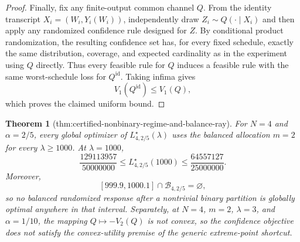 \documentclass{article}
\newtheorem{theorem}{Theorem}
\begin{document}
\begin{proof}
Finally, fix any finite-output common channel \(Q\). From the identity transcript \(X_i=(W_i,Y_i(W_i))\), independently draw \(Z_i\sim Q(\cdot\mid X_i)\) and then apply any randomized confidence rule designed for \(Z\). By conditional product randomization, the resulting confidence set has, for every fixed schedule, exactly the same distribution, coverage, and expected cardinality as in the experiment using \(Q\) directly. Thus every feasible rule for \(Q\) induces a feasible rule with the same worst-schedule loss for \(Q^{\mathrm{id}}\). Taking infima gives
\[
 V_1(Q^{\mathrm{id}})\le V_1(Q),
\]
which proves the claimed uniform bound.
\end{proof}

\begin{theorem}[thm:certified-nonbinary-regime-and-balance-ray]\label{thm:certified-nonbinary-regime-and-balance-ray}
For \(N=4\) and \(\alpha=2/5\), every global optimizer of \(L^\star_{4,2/5}(\lambda)\) uses the balanced allocation \(m=2\) for every \(\lambda\ge1000\). At \(\lambda=1000\),
\[
 \frac{129113957}{50000000}
 \le L^\star_{4,2/5}(1000)
 \le \frac{64557127}{25000000}.
\]
Moreover,
\[
 [999.9,1000.1]\cap\mathcal B_{4,2/5}=\varnothing,
\]
so no balanced randomized response after a nontrivial binary partition is globally optimal anywhere in that interval. Separately, at \(N=4\), \(m=2\), \(\lambda=3\), and \(\alpha=1/10\), the mapping \(Q\mapsto-V_2(Q)\) is not convex, so the confidence objective does not satisfy the convex-utility premise of the generic extreme-point shortcut.
\end{theorem}
\end{document}
